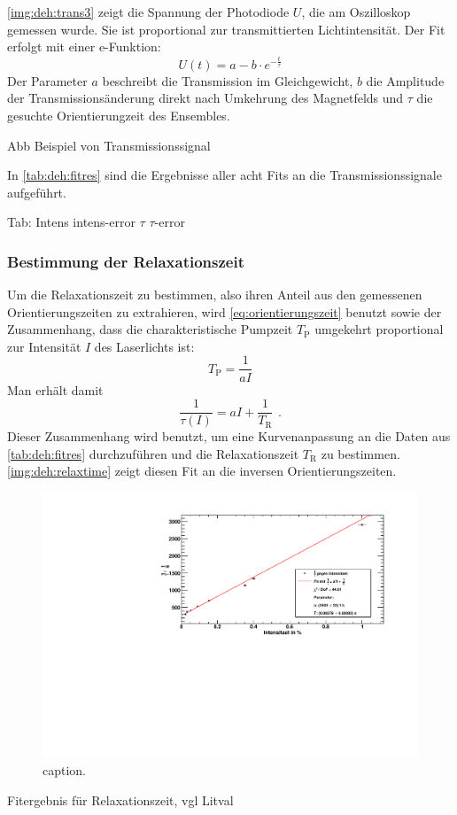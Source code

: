 \autoref{img:deh:trans3} zeigt die Spannung der Photodiode $U$, die am Oszilloskop gemessen wurde.
Sie ist proportional zur transmittierten Lichtintensität.
Der Fit erfolgt mit einer e-Funktion:
\begin{equation}
  U(t)=a - b \cdot e^{-\frac{t}{\tau}}
\end{equation}
Der Parameter $a$ beschreibt die Transmission im Gleichgewicht, $b$ die Amplitude der
Transmissionsänderung direkt nach Umkehrung des Magnetfelds und $\tau$ die gesuchte Orientierungzeit des Ensembles.


Abb Beispiel von Transmissionssignal
 


In \autoref{tab:deh:fitres} sind die Ergebnisse aller acht Fits an die Transmissionssignale aufgeführt.

Tab:
Intens		intens-error	$\tau$		$\tau$-error
 

\subsubsection*{Bestimmung der Relaxationszeit}
Um die Relaxationszeit zu bestimmen, also ihren Anteil aus den gemessenen Orientierungszeiten zu extrahieren,
wird \autoref{eq:orientierungszeit} benutzt sowie der Zusammenhang,
dass die charakteristische Pumpzeit $T_\text{P}$ umgekehrt proportional zur Intensität $I$ des Laserlichts ist:
\begin{equation}
  T_\text{P} = \frac{1}{aI} 
\end{equation}
Man erhält damit
\begin{equation}
  \frac{1}{\tau(I)}=aI + \frac{1}{T_\text{R}} \ \,.
\end{equation}
Dieser Zusammenhang wird benutzt, um eine Kurvenanpassung an die Daten aus \autoref{tab:deh:fitres}
durchzuführen und die Relaxationszeit $T_\text{R}$ zu bestimmen.
\autoref{img:deh:relaxtime} zeigt diesen Fit an die inversen Orientierungszeiten.

\begin{figure}[H]
\begin{center}
  \includegraphics[width=\textwidth]{../img/part5/taufit.pdf}
  \caption{caption.}
  \label{img:deh:relaxtime}
\end{center}
\end{figure}




Fitergebnis für Relaxationszeit, vgl Litval

